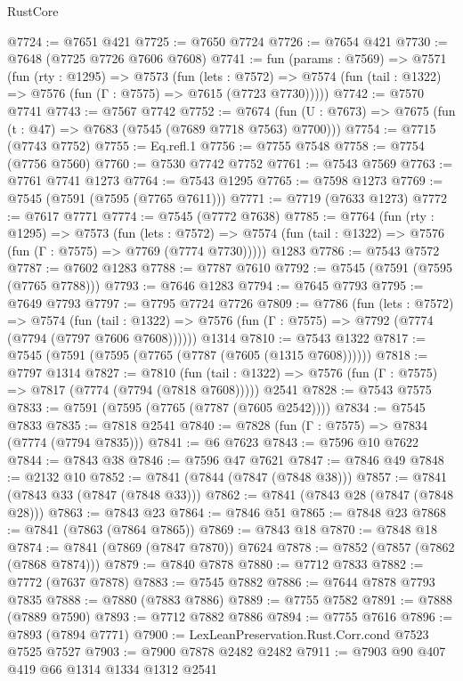 \begin{lexlean}{RustCore}
\begin{coremodule}
@7724 := @7651 @421
@7725 := @7650 @7724
@7726 := @7654 @421
@7730 := @7648 (@7725 @7726 @7606 @7608)
@7741 := fun (params : @7569) =>
  @7571
    (fun (rty : @1295) =>
    @7573
      (fun (lets : @7572) =>
      @7574 (fun (tail : @1322) => @7576 (fun (Γ : @7575) => @7615 (@7723 @7730)))))
@7742 := @7570 @7741
@7743 := @7567 @7742
@7752 := @7674 (fun (U : @7673) => @7675 (fun (t : @47) => @7683 (@7545 (@7689 @7718 @7563) @7700)))
@7754 := @7715 (@7743 @7752)
@7755 := Eq.refl.{1}
@7756 := @7755 @7548
@7758 := @7754 (@7756 @7560)
@7760 := @7530 @7742 @7752
@7761 := @7543 @7569
@7763 := @7761 @7741 @1273
@7764 := @7543 @1295
@7765 := @7598 @1273
@7769 := @7545 (@7591 (@7595 (@7765 @7611)))
@7771 := @7719 (@7633 @1273)
@7772 := @7617 @7771
@7774 := @7545 (@7772 @7638)
@7785 := @7764
    (fun (rty : @1295) =>
    @7573
      (fun (lets : @7572) =>
      @7574 (fun (tail : @1322) => @7576 (fun (Γ : @7575) => @7769 (@7774 @7730)))))
    @1283
@7786 := @7543 @7572
@7787 := @7602 @1283
@7788 := @7787 @7610
@7792 := @7545 (@7591 (@7595 (@7765 @7788)))
@7793 := @7646 @1283
@7794 := @7645 @7793
@7795 := @7649 @7793
@7797 := @7795 @7724 @7726
@7809 := @7786
    (fun (lets : @7572) =>
    @7574
      (fun (tail : @1322) => @7576 (fun (Γ : @7575) => @7792 (@7774 (@7794 (@7797 @7606 @7608))))))
    @1314
@7810 := @7543 @1322
@7817 := @7545 (@7591 (@7595 (@7765 (@7787 (@7605 (@1315 @7608))))))
@7818 := @7797 @1314
@7827 := @7810
    (fun (tail : @1322) => @7576 (fun (Γ : @7575) => @7817 (@7774 (@7794 (@7818 @7608)))))
    @2541
@7828 := @7543 @7575
@7833 := @7591 (@7595 (@7765 (@7787 (@7605 @2542))))
@7834 := @7545 @7833
@7835 := @7818 @2541
@7840 := @7828 (fun (Γ : @7575) => @7834 (@7774 (@7794 @7835)))
@7841 := @6 @7623
@7843 := @7596 @10 @7622
@7844 := @7843 @38
@7846 := @7596 @47 @7621
@7847 := @7846 @49
@7848 := @2132 @10
@7852 := @7841 (@7844 (@7847 (@7848 @38)))
@7857 := @7841 (@7843 @33 (@7847 (@7848 @33)))
@7862 := @7841 (@7843 @28 (@7847 (@7848 @28)))
@7863 := @7843 @23
@7864 := @7846 @51
@7865 := @7848 @23
@7868 := @7841 (@7863 (@7864 @7865))
@7869 := @7843 @18
@7870 := @7848 @18
@7874 := @7841 (@7869 (@7847 @7870)) @7624
@7878 := @7852 (@7857 (@7862 (@7868 @7874)))
@7879 := @7840 @7878
@7880 := @7712 @7833
@7882 := @7772 (@7637 @7878)
@7883 := @7545 @7882
@7886 := @7644 @7878 @7793 @7835
@7888 := @7880 (@7883 @7886)
@7889 := @7755 @7582
@7891 := @7888 (@7889 @7590)
@7893 := @7712 @7882 @7886
@7894 := @7755 @7616
@7896 := @7893 (@7894 @7771)
@7900 := LexLeanPreservation.Rust.Corr.cond @7523 @7525 @7527
@7903 := @7900 @7878 @2482 @2482
@7911 := @7903 @90 @407 @419 @66 @1314 @1334 @1312 @2541

\end{coremodule}
\end{lexlean}
